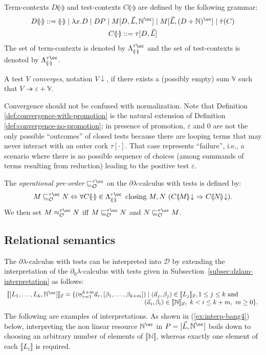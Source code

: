 \documentclass{LMCS}
\newcommand{\bool}{\mathbf{2}}
\newcommand{\st}{ \mid }
\newcommand{\dlam}{\ensuremath{\partial\lambda}}
\newcommand{\dzlam}{\ensuremath{\partial_0\lambda}}
\newcommand{\lam}{\ensuremath{\lambda}}
\newcommand{\bang}{\oc}
\renewcommand{\hole}[1]{\llparenthesis #1\rrparenthesis}
\newcommand{\Set}[1]{\Lambda^{#1}}
\newcommand{\FContSet}{\Set{\gt\bang}_{\hole{\cdot}}}
\newcommand{\msto}{\twoheadrightarrow}
\newcommand{\Fobsle}{\sqsubseteq^{\gt\bang}_{\mathcal{O}}}
\newcommand{\Fobseq}{\approx^{\gt\bang}_{\mathcal{O}}}
\newcommand{\Int}[1]{\llbracket #1\rrbracket} \newcommand{\trm}[1]{#1^{\textrm{--}}}
\newcommand{\mcup}{\uplus}
\newcommand{\gramm}{\mathrel{::=}}
\renewcommand{\iff}{\Leftrightarrow}
\newcommand{\seq}[1]{\vec{#1}}
\newcommand{\imp}{\Rightarrow}
\newcommand{\sN}{\mathbb{N}}
\newcommand{\sV}{\mathbb{V}}
\newcommand{\gt}{\ensuremath{\tau}}
\newcommand{\gto}{\ensuremath{\bar\tau}}
\newcommand{\cD}{\mathcal{D}}
\newcommand{\cOnv}[1]{#1\!\downarrow} \renewcommand{\div}[1]{#1\!\uparrow} \newcommand{\module}[1]{\bool\langle #1 \rangle}
\begin{document}
\begin{defi} Term-contexts $D\hole{\cdot}$ and test-contexts $C\hole{\cdot}$ are defined by the following grammar:
\begin{gather*}
	D\hole{\cdot}\gramm \hole{\cdot} \mid \lam x.D \mid DP  \mid M[D,\seq L,\sN^\bang]\mid M[\seq L,(D + \sN)^{\bang}] \mid \gto(C)\\
	C\hole{\cdot}\gramm \gt[D,\seq L]
\end{gather*}
The set of term-contexts is denoted by $\Set{\gto\bang}_{\hole{\cdot}}$ 
and the set of test-contexts is denoted by $\FContSet$.
\end{defi}


\begin{defi}\label{def:convergence-with-promotion}
A test $V$ \emph{converges}, notation $\cOnv{V}$, if there exists a (possibly empty) sum $\sV$ such that $V \msto \varepsilon + \sV$.
\end{defi}

Convergence should not be confused with normalization. Note that Definition \ref{def:convergence-with-promotion} is the natural extension of Definition \ref{def:convergence-no-promotion};
 in presence of promotion, $\varepsilon$ and $0$ are not the only possible ``outcomes'' of closed tests because there are looping terms that may never interact with an outer cork $\gt[\cdot]$.
 That case represents ``failure'', i.e., a scenario where there is no possible sequence of choices (among summands of terms resulting from reduction)
 leading to the positive test $\varepsilon$.

\begin{defi} The \emph{operational pre-order} $\Fobsle$ on the \dlam-calculus with tests is defined by:
$$
	M\Fobsle N \iff \forall C\hole{\cdot}\in\FContSet\,\textrm{ closing $M,N$ }(\cOnv{C\hole{M}}\ \imp \cOnv{C\hole{N}}).
$$
We then set $M\Fobseq N$ iff $M\Fobsle N$ and $N\Fobsle M$.
\end{defi}

\subsection{Relational semantics} 

The \dlam-calculus with tests can be interpreted into $\cD$ by extending the interpretation of 
the \dzlam-calculus with tests given in Subsection~\ref{subsec:dzlam-interpretation} as follows:
$$
\hspace{-1pt}
\begin{array}{l}
\Int{[L_1,\dots,L_k,\sN^{\bang}]}_{\seq x} = \{(\mcup_{r=1}^{k+m} \seq a_r,[\beta_1,\ldots,\beta_{k + m}]) \st (\seq a_j,\beta_j)\in\Int{L_j}_{\seq x},1\le j\le k \textrm{ and } \\
\qquad\qquad\qquad\qquad\qquad\qquad\qquad\qquad\qquad\qquad\quad\ \!  (\seq a_i,\beta_i)\in \Int{\sN}_{\seq x},\ k < i\le k + m,\ m\geq 0\}.
\end{array}
$$
The following are examples of interpretations.
As shown in (\ref{ex:interp-bang4}) below, interpreting the non linear resource $\sN^{\bang}$  in $P=[\seq L,\sN^{\bang}]$ boils down to choosing an arbitrary number of elements of  $\Int{\sN}$, whereas exactly one element of each $\Int{L_i}$ is required.
\end{document}
